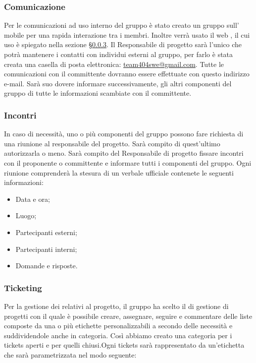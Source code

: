 \documentclass[a4paper,11pt]{article}
\begin{document}
				
		
		\subsubsection{Comunicazione}
			Per le comunicazioni ad uso interno del gruppo è stato creato un gruppo sull' mobile  per una rapida interazione tra i membri. Inoltre verrà usato il web  , il cui uso è spiegato nella sezione §\ref{subsec:ticketing}.
			Il Responsabile di progetto sarà l'unico che potrà mantenere i contatti con individui esterni al gruppo, per farlo è stata creata una casella di posta elettronica: \url{team404swe@gmail.com}. Tutte le comunicazioni con il committente dovranno essere effettuate con questo indirizzo e-mail. Sarà suo dovere informare successivamente, gli altri componenti del gruppo di tutte le informazioni scambiate con il committente.
		\subsubsection{Incontri}
		In caso di necessità, uno o più componenti del gruppo possono fare richiesta di una riunione al responsabile del progetto. Sarà compito di quest'ultimo autorizzarla o meno. 
		Sarà compito del Responsabile di progetto fissare incontri con il proponente o committente e informare tutti i componenti del gruppo. Ogni riunione comprenderà la stesura di un verbale ufficiale contenete le seguenti informazioni:
\begin{itemize}
\item Data e ora;
\item Luogo;
\item Partecipanti esterni;
\item Partecipanti interni;
\item Domande e risposte.
\end{itemize}
		
		\subsubsection{Ticketing} 	\label{subsec:ticketing}
		Per la gestione dei  relativi al progetto, il gruppo ha scelto il  di gestione di progetti  con il quale è possibile creare, assegnare, seguire e commentare delle liste composte
da una o più etichette personalizzabili a secondo delle necessità e suddividendole anche in categoria. Così abbiamo creato una categoria  per i tickets aperti e  per quelli chiusi.Ogni tickets sarà rappresentato da un'etichetta che sarà parametrizzata nel modo seguente:
\end{document}
